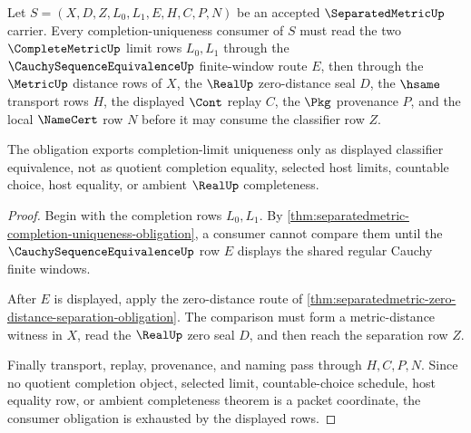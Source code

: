 \begin{theorem}
\label{thm:separatedmetric-completion-uniqueness-consumer-obligation}
Let $S=(X,D,Z,L_0,L_1,E,H,C,P,N)$ be an accepted $\SeparatedMetricUp$ carrier. Every completion-uniqueness consumer of $S$ must read the two $\CompleteMetricUp$ limit rows $L_0,L_1$ through the $\CauchySequenceEquivalenceUp$ finite-window route $E$, then through the $\MetricUp$ distance rows of $X$, the $\RealUp$ zero-distance seal $D$, the $\hsame$ transport rows $H$, the displayed $\Cont$ replay $C$, the $\Pkg$ provenance $P$, and the local $\NameCert$ row $N$ before it may consume the classifier row $Z$.

The obligation exports completion-limit uniqueness only as displayed classifier equivalence, not as quotient completion equality, selected host limits, countable choice, host equality, or ambient $\RealUp$ completeness.
\end{theorem}
\begin{proof}
Begin with the completion rows $L_0,L_1$. By \autoref{thm:separatedmetric-completion-uniqueness-obligation}, a consumer cannot compare them until the $\CauchySequenceEquivalenceUp$ row $E$ displays the shared regular Cauchy finite windows.

After $E$ is displayed, apply the zero-distance route of \autoref{thm:separatedmetric-zero-distance-separation-obligation}. The comparison must form a metric-distance witness in $X$, read the $\RealUp$ zero seal $D$, and then reach the separation row $Z$.

Finally transport, replay, provenance, and naming pass through $H,C,P,N$. Since no quotient completion object, selected limit, countable-choice schedule, host equality row, or ambient completeness theorem is a packet coordinate, the consumer obligation is exhausted by the displayed rows.
\end{proof}

